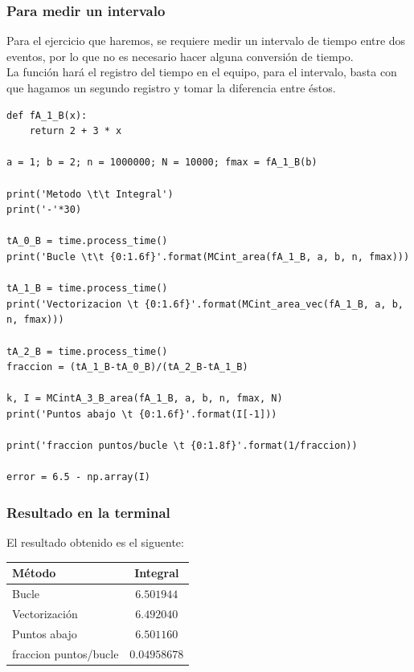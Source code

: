\begin{frame}
\frametitle{Para medir un intervalo}
Para el ejercicio que haremos, se requiere medir un intervalo de tiempo entre dos eventos, por lo que no es necesario hacer alguna conversión de tiempo.
\\
\bigskip
La función  hará el registro del tiempo en el equipo, para el intervalo, basta con que hagamos un segundo registro y tomar la diferencia entre éstos.
\end{frame}
\begin{frame}
\begin{lstlisting}[caption=Implementación del código, style=codigopython]
def fA_1_B(x):
    return 2 + 3 * x

a = 1; b = 2; n = 1000000; N = 10000; fmax = fA_1_B(b)

print('Metodo \t\t Integral')
print('-'*30)

tA_0_B = time.process_time()
print('Bucle \t\t {0:1.6f}'.format(MCint_area(fA_1_B, a, b, n, fmax)))

tA_1_B = time.process_time()
print('Vectorizacion \t {0:1.6f}'.format(MCint_area_vec(fA_1_B, a, b, n, fmax)))

tA_2_B = time.process_time()
fraccion = (tA_1_B-tA_0_B)/(tA_2_B-tA_1_B)

k, I = MCintA_3_B_area(fA_1_B, a, b, n, fmax, N)
print('Puntos abajo \t {0:1.6f}'.format(I[-1]))

print('fraccion puntos/bucle \t {0:1.8f}'.format(1/fraccion))

error = 6.5 - np.array(I)
\end{lstlisting}
\end{frame}
\begin{frame}
\frametitle{Resultado en la terminal}
El resultado obtenido es el siguente:
\begin{table}
\begin{tabular}{l c}
Método & Integral \\ \hline
Bucle & $6.501944$ \\ \hline
Vectorización & $6.492040$ \\ \hline
Puntos abajo & $6.501160$ \\ \hline
fraccion puntos/bucle & $0.04958678$ \\
\end{tabular}
\end{table}
\end{frame}
